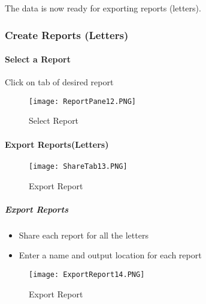 \noindent The data is now ready for exporting reports (letters).

\clearpage


\subsubsection{Create Reports (Letters)}

\paragraph{Select a Report}
\vspace{.5in}

\noindent Click on tab of desired report

\vspace{1in}

\begin{figure}[h!]
 \centering
     \texttt{[image: ReportPane12.PNG]}
 \caption{Select Report}


 \end{figure}

\clearpage

\paragraph{Export Reports(Letters)}
\vspace{.5in}


\begin{figure}[h!]
 \centering
     \texttt{[image: ShareTab13.PNG]}
 \caption{Export Report}


 \end{figure} 


\clearpage

\subparagraph{Export Reports}

\begin{itemize}

\item Share each report for all the letters

\item Enter a name and output location for each report

\end{itemize}



\begin{figure}[h!]
 \centering
     \texttt{[image: ExportReport14.PNG]}
 \caption{Export Report}


 \end{figure} 


